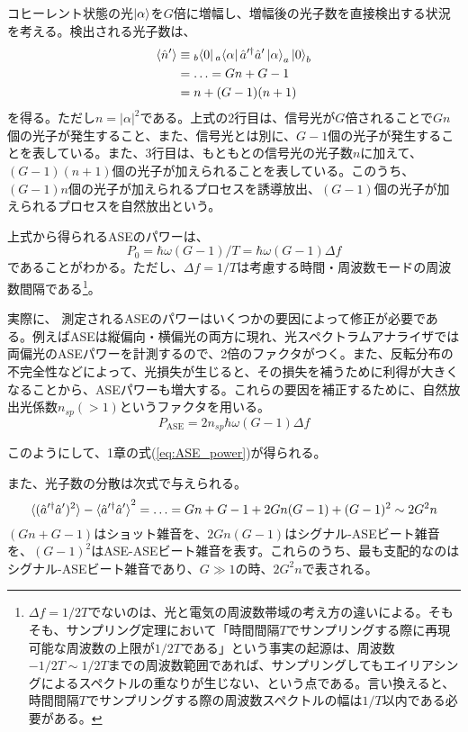 コヒーレント状態の光$\ket \alpha$を$G$倍に増幅し、増幅後の光子数を直接検出する状況を考える。検出される光子数は、
\begin{equation}
\begin{aligned}
  \braket{\hat n'} &\equiv {}_b\!\bra 0 {}_a\! \bra \alpha \hat a'^\dagger \hat a' \ket \alpha _ a \ket 0_b\\
  &= \hdots = Gn + G - 1 \\
  &= n + (G-1)(n + 1)
\end{aligned}
\end{equation}
を得る。ただし$n = |\alpha|^2$である。上式の2行目は、信号光が$G$倍されることで$Gn$個の光子が発生すること、また、信号光とは別に、$G-1$個の光子が発生することを表している。また、3行目は、もともとの信号光の光子数$n$に加えて、$(G - 1)(n + 1)$個の光子が加えられることを表している。このうち、$(G - 1)n$個の光子が加えられるプロセスを誘導放出、$(G - 1)$個の光子が加えられるプロセスを自然放出という。

上式から得られるASEのパワーは、
\begin{equation}
  P_0 = \hbar \omega (G - 1) / T = \hbar \omega (G - 1) \Delta f 
\end{equation}
であることがわかる。ただし、$\Delta f = 1 / T$は考慮する時間・周波数モードの周波数間隔である\footnote{$\Delta f = 1 / 2T$でないのは、光と電気の周波数帯域の考え方の違いによる。そもそも、サンプリング定理において「時間間隔$T$でサンプリングする際に再現可能な周波数の上限が$1/2T$である」という事実の起源は、周波数$-1/2T \sim 1/2T$までの周波数範囲であれば、サンプリングしてもエイリアシングによるスペクトルの重なりが生じない、という点である。言い換えると、時間間隔$T$でサンプリングする際の周波数スペクトルの幅は$1/T$以内である必要がある。}。

実際に、
測定されるASEのパワーはいくつかの要因によって修正が必要である。例えばASEは縦偏向・横偏光の両方に現れ、光スペクトラムアナライザでは両偏光のASEパワーを計測するので、2倍のファクタがつく。また、反転分布の不完全性などによって、光損失が生じると、その損失を補うために利得が大きくなることから、ASEパワーも増大する。これらの要因を補正するために、自然放出光係数$n_{sp} (>1)$というファクタを用いる。
\begin{equation}
  P_\mathrm{ASE} = 2n_{sp}\hbar \omega (G-1) \Delta f
\end{equation}

このようにして、1章の式(\ref{eq:ASE_power})が得られる。

また、光子数の分散は次式で与えられる。
\begin{equation}
  \braket{(\hat a'^\dagger \hat a')^2} - \braket{\hat a'^\dagger \hat a'}^2 = \hdots = Gn + G-1 + 2Gn(G - 1) + (G - 1)^2 \sim 2G^2n
  \label{eq:variance_of_photon_number_after_amplification}
\end{equation}
$(Gn + G - 1)$はショット雑音を、$2Gn(G - 1)$はシグナル-ASEビート雑音を、$(G - 1)^2$はASE-ASEビート雑音を表す。これらのうち、最も支配的なのはシグナル-ASEビート雑音であり、$G\gg1$の時、$2G^2n$で表される。

